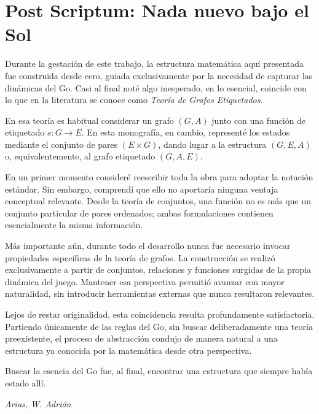 \thispagestyle{empty}
\section*{Post Scriptum: Nada nuevo bajo el Sol}

Durante la gestación de este trabajo, la estructura matemática aquí presentada fue construida desde cero, guiada exclusivamente por la necesidad de capturar las dinámicas del Go. Casi al final noté algo inesperado, en lo esencial, coincide con lo que en la literatura se conoce como \textit{Teoría de Grafos Etiquetados}.

En esa teoría es habitual considerar un grafo $(G,A)$ junto con una función de etiquetado $s:G\to E$. En esta monografía, en cambio, representé los estados mediante el conjunto de pares $(E\times G)$, dando lugar a la estructura $(G,E,A)$ o, equivalentemente, al grafo etiquetado $(G,A,E)$.

En un primer momento consideré reescribir toda la obra para adoptar la notación estándar. Sin embargo, comprendí que ello no aportaría ninguna ventaja conceptual relevante. Desde la teoría de conjuntos, una función no es más que un conjunto particular de pares ordenados; ambas formulaciones contienen esencialmente la misma información.

Más importante aún, durante todo el desarrollo nunca fue necesario invocar propiedades específicas de la teoría de grafos. La construcción se realizó exclusivamente a partir de conjuntos, relaciones y funciones surgidas de la propia dinámica del juego. Mantener esa perspectiva permitió avanzar con mayor naturalidad, sin introducir herramientas externas que nunca resultaron relevantes.

Lejos de restar originalidad, esta coincidencia resulta profundamente satisfactoria. Partiendo únicamente de las reglas del Go, sin buscar deliberadamente una teoría preexistente, el proceso de abstracción condujo de manera natural a una estructura ya conocida por la matemática desde otra perspectiva.

\noindent
Buscar la esencia del Go fue, al final, encontrar una estructura que siempre había estado allí.
\vfill
\begin{flushright}
	\textit{Arias, W. Adrián}
\end{flushright}